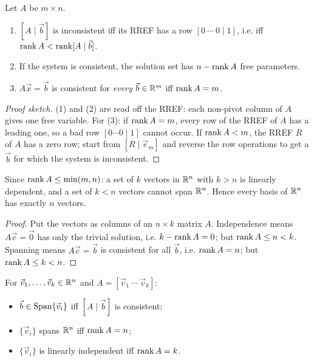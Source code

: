 \begin{theorem}
Let $A$ be $m\times n$.
\begin{enumerate}
  \item $[A\mid\vec b]$ is inconsistent iff its RREF has a row $[0\ \cdots\ 0\mid 1]$, i.e. iff
        $\operatorname{rank} A < \operatorname{rank}[A\mid\vec b]$.
  \item If the system is consistent, the solution set has $n-\operatorname{rank} A$ free parameters.
  \item $A\vec x=\vec b$ is consistent for \emph{every} $\vec b\in\mathbb{R}^m$ iff $\operatorname{rank} A = m$.
\end{enumerate}
\end{theorem}
\begin{proof}[Proof sketch]
(1) and (2) are read off the RREF: each non-pivot column of $A$ gives one free variable.
For (3): if $\operatorname{rank} A=m$, every row of the RREF of $A$ has a leading one, so a bad row
$[0\cdots0\mid 1]$ cannot occur. If $\operatorname{rank} A<m$, the RREF $R$ of $A$ has a zero row; start from
$[R\mid\vec e_m]$ and reverse the row operations to get a $\vec b$ for which the system is
inconsistent.
\end{proof}

\begin{corollary}
Since $\operatorname{rank} A\le\min(m,n)$: a set of $k$ vectors in $\mathbb{R}^n$ with $k>n$ is linearly dependent, and a
set of $k<n$ vectors cannot span $\mathbb{R}^n$. Hence every basis of $\mathbb{R}^n$ has exactly $n$ vectors.
\end{corollary}
\begin{proof}
Put the vectors as columns of an $n\times k$ matrix $A$. Independence means $A\vec c=\vec 0$ has
only the trivial solution, i.e. $k-\operatorname{rank} A=0$; but $\operatorname{rank} A\le n<k$. Spanning means $A\vec c=\vec b$
is consistent for all $\vec b$, i.e. $\operatorname{rank} A = n$; but $\operatorname{rank} A\le k<n$.
\end{proof}

\begin{important}
For $\vec v_1,\dots,\vec v_k\in\mathbb{R}^n$ and $A=[\vec v_1\ \cdots\ \vec v_k]$:
\begin{itemize}
  \item $\vec b\in\operatorname{Span}\{\vec v_i\}$ iff $[A\mid\vec b]$ is consistent;
  \item $\{\vec v_i\}$ spans $\mathbb{R}^n$ iff $\operatorname{rank} A = n$;
  \item $\{\vec v_i\}$ is linearly independent iff $\operatorname{rank} A = k$.
\end{itemize}
\end{important}

